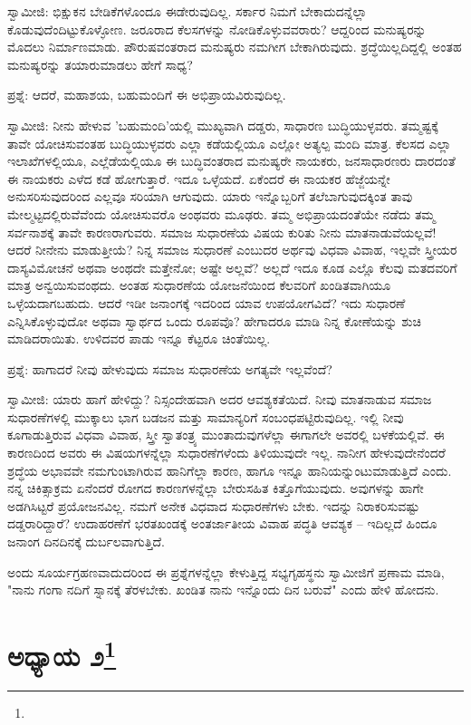 ಸ್ವಾಮೀಜಿ: ಭಿಕ್ಷುಕನ ಬೇಡಿಕೆಗಳೊಂದೂ ಈಡೇರುವುದಿಲ್ಲ. ಸರ್ಕಾರ ನಿಮಗೆ ಬೇಕಾದುದನ್ನೆಲ್ಲಾ ಕೊಡುವುದೆಂದಿಟ್ಟುಕೊಳ್ಳೋಣ. ಜರೂರಾದ ಕೆಲಸಗಳನ್ನು ನೋಡಿಕೊಳ್ಳುವವರಾರು? ಆದ್ದರಿಂದ ಮನುಷ್ಯರನ್ನು ಮೊದಲು ನಿರ್ಮಾಣಮಾಡು. ಪೌರುಷವಂತರಾದ ಮನುಷ್ಯರು ನಮಗೀಗ ಬೇಕಾಗಿರುವುದು. ಶ್ರದ್ಧೆಯಿಲ್ಲದಿದ್ದಲ್ಲಿ ಅಂತಹ ಮನುಷ್ಯರನ್ನು ತಯಾರುಮಾಡಲು ಹೇಗೆ ಸಾಧ್ಯ?

ಪ್ರಶ್ನೆ: ಆದರೆ, ಮಹಾಶಯ, ಬಹುಮಂದಿಗೆ ಈ ಅಭಿಪ್ರಾಯವಿರುವುದಿಲ್ಲ.

ಸ್ವಾಮೀಜಿ: ನೀನು ಹೇಳುವ 'ಬಹುಮಂದಿ'ಯಲ್ಲಿ ಮುಖ್ಯವಾಗಿ ದಡ್ಡರು, ಸಾಧಾರಣ ಬುದ್ಧಿಯುಳ್ಳವರು. ತಮ್ಮಷ್ಟಕ್ಕೆ ತಾವೇ ಯೋಚಿಸುವಂತಹ ಬುದ್ಧಿಯುಳ್ಳವರು ಎಲ್ಲಾ ಕಡೆಯಲ್ಲಿಯೂ ಎಲ್ಲೋ ಅತ್ಯಲ್ಪ ಮಂದಿ ಮಾತ್ರ. ಕೆಲಸದ ಎಲ್ಲಾ ಇಲಾಖೆಗಳಲ್ಲಿಯೂ, ಎಲ್ಲೆಡೆಯಲ್ಲಿಯೂ ಈ ಬುದ್ಧಿವಂತರಾದ ಮನುಷ್ಯರೇ ನಾಯಕರು, ಜನಸಾಧಾರಣರು ದಾರದಂತೆ ಈ ನಾಯಕರು ಎಳೆದ ಕಡೆ ಹೋಗುತ್ತಾರೆ. ಇದೂ ಒಳ್ಳೆಯದೆ. ಏಕೆಂದರೆ ಈ ನಾಯಕರ ಹೆಜ್ಜೆಯನ್ನೇ ಅನುಸರಿಸುವುದರಿಂದ ಎಲ್ಲವೂ ಸರಿಯಾಗಿ ಆಗುವುದು. ಯಾರು ಇನ್ನೊಬ್ಬರಿಗೆ ತಲೆಬಾಗುವುದಕ್ಕಿಂತ ತಾವು ಮೇಲ್ಮಟ್ಟದಲ್ಲಿರುವೆವೆಂದು ಯೋಚಿಸುವರೊ ಅಂಥವರು ಮೂಢರು. ತಮ್ಮ ಅಭಿಪ್ರಾಯದಂತೆಯೇ ನಡೆದು ತಮ್ಮ ಸರ್ವನಾಶಕ್ಕೆ ತಾವೇ ಕಾರಣರಾಗುವರು. ಸಮಾಜ ಸುಧಾರಣೆಯ ವಿಷಯ ಕುರಿತು ನೀನು ಮಾತನಾಡುವೆಯಲ್ಲವೆ! ಆದರೆ ನೀನೇನು ಮಾಡುತ್ತೀಯೆ? ನಿನ್ನ ಸಮಾಜ ಸುಧಾರಣೆ ಎಂಬುದರ ಅರ್ಥವು ವಿಧವಾ ವಿವಾಹ, ಇಲ್ಲವೇ ಸ್ತ್ರೀಯರ ದಾಸ್ಯವಿಮೋಚನೆ ಅಥವಾ ಅಂಥದೇ ಮತ್ತೇನೋ; ಅಷ್ಟೇ ಅಲ್ಲವೆ? ಅಲ್ಲದೆ ಇದೂ ಕೂಡ ಎಲ್ಲೊ ಕೆಲವು ಮತದವರಿಗೆ ಮಾತ್ರ ಅನ್ವಯಿಸುವಂಥದು. ಅಂತಹ ಸುಧಾರಣೆಯ ಯೋಜನೆಯಿಂದ ಕೆಲವರಿಗೆ ಖಂಡಿತವಾಗಿಯೂ ಒಳ್ಳೆಯದಾಗಬಹುದು. ಆದರೆ ಇಡೀ ಜನಾಂಗಕ್ಕೆ ಇದರಿಂದ ಯಾವ ಉಪಯೋಗವಿದೆ? ಇದು ಸುಧಾರಣೆ ಎನ್ನಿಸಿಕೊಳ್ಳುವುದೋ ಅಥವಾ ಸ್ವಾರ್ಥದ ಒಂದು ರೂಪವೊ? ಹೇಗಾದರೂ ಮಾಡಿ ನಿನ್ನ ಕೋಣೆಯನ್ನು ಶುಚಿ ಮಾಡಿದರಾಯಿತು. ಉಳಿದವರ ಪಾಡು ಇನ್ನೂ ಕೆಟ್ಟರೂ ಚಿಂತೆಯಿಲ್ಲ.

ಪ್ರಶ್ನೆ: ಹಾಗಾದರೆ ನೀವು ಹೇಳುವುದು ಸಮಾಜ ಸುಧಾರಣೆಯ ಅಗತ್ಯವೇ ಇಲ್ಲವೆಂದೆ?

ಸ್ವಾಮೀಜಿ: ಯಾರು ಹಾಗೆ ಹೇಳಿದ್ದು? ನಿಸ್ಸಂದೇಹವಾಗಿ ಅದರ ಆವಶ್ಯಕತೆಯಿದೆ. ನೀವು ಮಾತನಾಡುವ ಸಮಾಜ ಸುಧಾರಣೆಗಳಲ್ಲಿ ಮುಕ್ಕಾಲು ಭಾಗ ಬಡಜನ ಮತ್ತು ಸಾಮಾನ್ಯರಿಗೆ ಸಂಬಂಧಪಟ್ಟಿರುವುದಿಲ್ಲ. ಇಲ್ಲಿ ನೀವು ಕೂಗಾಡುತ್ತಿರುವ ವಿಧವಾ ವಿವಾಹ, ಸ್ತ್ರೀ ಸ್ವಾತಂತ್ರ್ಯ ಮುಂತಾದುವುಗಳೆಲ್ಲಾ ಈಗಾಗಲೇ ಅವರಲ್ಲಿ ಬಳಕೆಯಲ್ಲಿವೆ. ಈ ಕಾರಣದಿಂದ ಅವರು ಈ ವಿಷಯಗಳನ್ನೆಲ್ಲಾ ಸುಧಾರಣೆಗಳೆಂದು ತಿಳಿಯುವುದೇ ಇಲ್ಲ. ನಾನೀಗ ಹೇಳುವುದೇನೆಂದರೆ ಶ್ರದ್ಧೆಯ ಅಭಾವವೇ ನಮಗುಂಟಾಗಿರುವ ಹಾನಿಗೆಲ್ಲಾ ಕಾರಣ, ಹಾಗೂ ಇನ್ನೂ ಹಾನಿಯನ್ನುಂಟುಮಾಡುತ್ತಿದೆ ಎಂದು. ನನ್ನ ಚಿಕಿತ್ಸಾಕ್ರಮ ಏನೆಂದರೆ ರೋಗದ ಕಾರಣಗಳನ್ನೆಲ್ಲಾ ಬೇರುಸಹಿತ ಕಿತ್ತೊಗೆಯುವುದು. ಅವುಗಳನ್ನು ಹಾಗೇ ಅಡಗಿಸಿಟ್ಟರೆ ಪ್ರಯೋಜನವಿಲ್ಲ. ನಮಗೆ ಅನೇಕ ವಿಧವಾದ ಸುಧಾರಣೆಗಳು ಬೇಕು. ಇದನ್ನು ನಿರಾಕರಿಸುವಷ್ಟು ದಡ್ಡರಾರಿದ್ದಾರೆ? ಉದಾಹರಣೆಗೆ ಭರತಖಂಡಕ್ಕೆ ಅಂತರ್ಜಾತೀಯ ವಿವಾಹ ಪದ್ಧತಿ ಆವಶ್ಯಕ – ಇದಿಲ್ಲದೆ ಹಿಂದೂ ಜನಾಂಗ ದಿನದಿನಕ್ಕೆ ದುರ್ಬಲವಾಗುತ್ತಿದೆ.

ಅಂದು ಸೂರ್ಯಗ್ರಹಣವಾದುದರಿಂದ ಈ ಪ್ರಶ್ನೆಗಳನ್ನೆಲ್ಲಾ ಕೇಳುತ್ತಿದ್ದ ಸಭ್ಯಗೃಹಸ್ಥನು ಸ್ವಾಮೀಜಿಗೆ ಪ್ರಣಾಮ ಮಾಡಿ, "ನಾನು ಗಂಗಾ ನದಿಗೆ ಸ್ನಾನಕ್ಕೆ ತೆರಳಬೇಕು. ಖಂಡಿತ ನಾನು ಇನ್ನೊಂದು ದಿನ ಬರುವೆ" ಎಂದು ಹೇಳಿ ಹೋದನು.

\newpage

\chapter[ಅಧ್ಯಾಯ ೨]{ಅಧ್ಯಾಯ ೨\protect\footnote{}}


